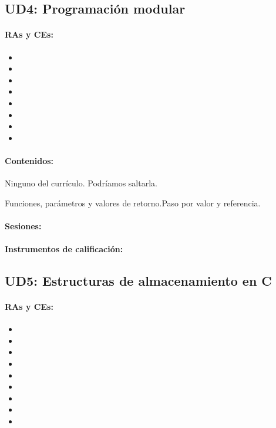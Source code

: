 \newpage
\subsection{UD4: Programación modular}
	\paragraph{RAs y CEs:}
	\begin{itemize}[itemsep=0.1em, topsep=0.1em]
		\item\RAUNOf
		\item\RAUNOi			
		\item\RATRESe
		\item\RATRESf
		\item\RATRESg 
		\item\RACINCOa
		\item\RACINCOb
		\item\RACINCOc			
	\end{itemize}

	\paragraph{Contenidos:}
		Ninguno del currículo. Podríamos saltarla.

		Funciones, parámetros y valores de retorno.Paso por valor y referencia.


	\paragraph{Sesiones:}
	
	\paragraph{Instrumentos de calificación:}


\newpage
\subsection{UD5: Estructuras de almacenamiento en C}
	\paragraph{RAs y CEs:}
	\begin{itemize}[itemsep=0.1em, topsep=0.1em]
		\item\RAUNOf
		\item\RAUNOi			
		\item\RATRESe
		\item\RATRESf
		\item\RATRESg
		\item\RASEISa
		\item\RACINCOa
		\item\RACINCOb
		\item\RACINCOc	
	\end{itemize}
 	
